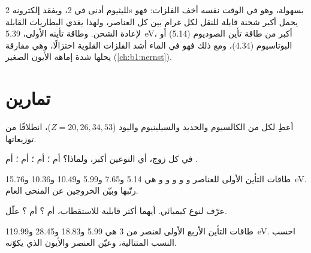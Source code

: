 \begin{example}\label{ex:b1:periodicity:lithium}
لليثيوم أدنى  في  2، ويفقد إلكترونه 2s
بسهولة، وهو في الوقت نفسه أخف الفلزات: فهو يحمل أكبر شحنة قابلة
للنقل لكل غرام بين كل العناصر، ولهذا يغذي البطاريات
القابلة لإعادة الشحن. وطاقة تأينه الأولى، \qty{5.39}{eV}، أكبر
من طاقة تأين الصوديوم (5.14) أو البوتاسيوم (4.34)، ومع ذلك فهو في الماء
أشد الفلزات القلوية اختزالًا، وهي مفارقة يحلها شدة
إماهة الأيون الصغير  (\cref{ch:b1:nernst}).
\end{example}

\section{تمارين}

\begin{exercise}[$\star$]\label{exo:b1:periodicity:1}
أعطِ    لكل من الكالسيوم والحديد والسيلينيوم
واليود ($Z = 20, 26, 34, 53$)، انطلاقًا من توزيعاتها.
\end{exercise}

\begin{exercise}[$\star$]\label{exo:b1:periodicity:2}
في كل زوج، أي النوعين أكبر، ولماذا؟  أم ؛
 أم ؛  أم ؛  أم .
\end{exercise}

\begin{exercise}[$\star$]\label{exo:b1:periodicity:3}
طاقات التأين الأولى للعناصر  و و و
و و هي 5.14 و7.65 و5.99 و10.49 و10.36
و\qty{15.76}{eV}. رتّبها وبيّن الخروجين عن
المنحى العام.
\end{exercise}

\begin{exercise}[$\star$]\label{exo:b1:periodicity:4}
عرّف  لنوع كيميائي. أيهما أكثر قابلية للاستقطاب، 
أم ؟  أم ؟ علّل.
\end{exercise}

\begin{exercise}[$\star\star$]\label{exo:b1:periodicity:5}
طاقات التأين الأربع الأولى لعنصر من  3 هي 5.99
و18.83 و28.45 و\qty{119.99}{eV}. احسب النسب المتتالية،
وعيّن العنصر والأيون الذي يكوّنه.
\end{exercise}

